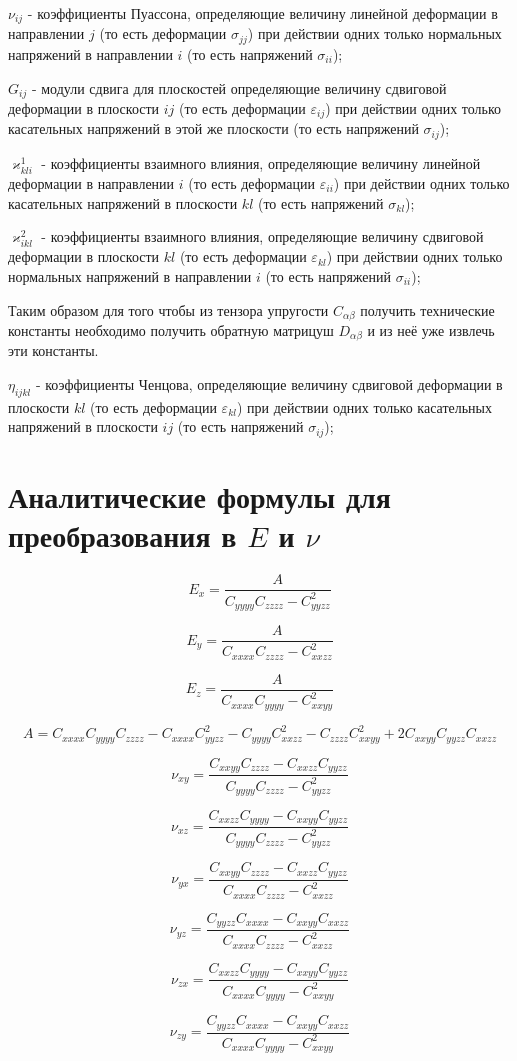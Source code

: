 $\nu_{ij}$ - коэффициенты Пуассона, определяющие величину линейной деформации в направлении 
$j$ 
(то есть деформации 
$\sigma_{jj}$)
при действии одних только нормальных напряжений в направлении 
$i$ 
(то есть напряжений 
$\sigma_{ii}$);

$G_{ij}$ - модули сдвига для плоскостей определяющие величину сдвиговой деформации в плоскости 
$ij$ 
(то есть деформации 
$\varepsilon_{ij}$)
при действии одних только касательных напряжений в этой же плоскости (то есть напряжений 
$\sigma_{ij}$);

$\varkappa^1_{kli}$ - коэффициенты взаимного влияния, определяющие величину линейной деформации в направлении 
$i$ 
(то есть деформации 
$\varepsilon_{ii}$)
при действии одних только касательных напряжений в плоскости 
$kl$ 
(то есть напряжений 
$\sigma_{kl}$);

$\varkappa^2_{ikl}$ - коэффициенты взаимного влияния, определяющие величину сдвиговой деформации в плоскости 
$kl$ 
(то есть деформации 
$\varepsilon_{kl}$)
при действии одних только нормальных напряжений в направлении 
$i$ 
(то есть напряжений 
$\sigma_{ii}$);

Таким образом для того чтобы из тензора упругости 
$C_{\alpha\beta}$ 
получить технические константы необходимо получить обратную матрицуш 
$D_{\alpha\beta}$ 
и из неё уже извлечь эти константы.

$\eta_{ijkl}$ - коэффициенты Ченцова, определяющие величину сдвиговой деформации в плоскости 
$kl$ 
(то есть деформации 
$\varepsilon_{kl}$)
при действии одних только касательных напряжений в плоскости 
$ij$ 
(то есть напряжений 
$\sigma_{ij}$);

\section{
Аналитические формулы для преобразования в 
$E$ 
и 
$\nu$}

$$
E_x = \frac{A}{C_{yyyy}C_{zzzz}-C_{yyzz}^2}
$$

$$
E_y = \frac{A}{C_{xxxx}C_{zzzz}-C_{xxzz}^2}
$$

$$
E_z = \frac{A}{C_{xxxx}C_{yyyy}-C_{xxyy}^2}
$$

$$
A = C_{xxxx}C_{yyyy}C_{zzzz} - C_{xxxx}C_{yyzz}^2 - C_{yyyy}C_{xxzz}^2 -
C_{zzzz}C_{xxyy}^2 + 2C_{xxyy}C_{yyzz}C_{xxzz}
$$

$$
\nu_{xy} = \frac{C_{xxyy}C_{zzzz}-C_{xxzz}C_{yyzz}}{C_{yyyy}C_{zzzz}-C_{yyzz}^2}
$$

$$
\nu_{xz} = \frac{C_{xxzz}C_{yyyy}-C_{xxyy}C_{yyzz}}{C_{yyyy}C_{zzzz}-C_{yyzz}^2}
$$

$$
\nu_{yx} = \frac{C_{xxyy}C_{zzzz}-C_{xxzz}C_{yyzz}}{C_{xxxx}C_{zzzz}-C_{xxzz}^2}
$$

$$
\nu_{yz} = \frac{C_{yyzz}C_{xxxx}-C_{xxyy}C_{xxzz}}{C_{xxxx}C_{zzzz}-C_{xxzz}^2}
$$

$$
\nu_{zx} = \frac{C_{xxzz}C_{yyyy}-C_{xxyy}C_{yyzz}}{C_{xxxx}C_{yyyy}-C_{xxyy}^2}
$$

$$
\nu_{zy} = \frac{C_{yyzz}C_{xxxx}-C_{xxyy}C_{xxzz}}{C_{xxxx}C_{yyyy}-C_{xxyy}^2}
$$
